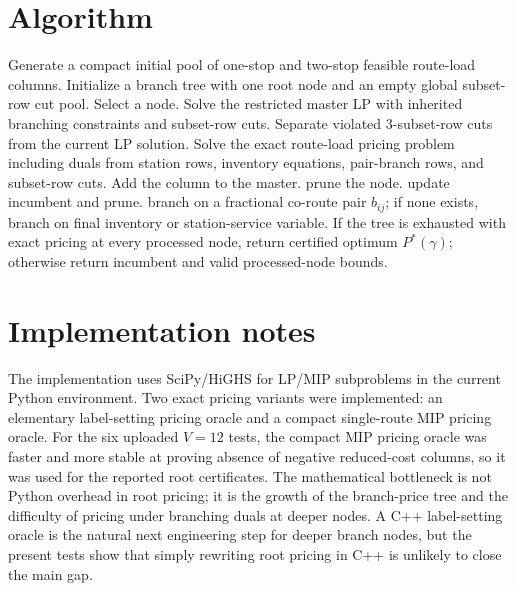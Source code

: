 \documentclass[11pt]{article}
\begin{document}
\section{Algorithm}

\begin{algorithm}[H]
\caption{GF-RL-BPC for a fixed Gini cap $\gamma$}
\begin{algorithmic}[1]
\State Generate a compact initial pool of one-stop and two-stop feasible route-load columns.
\State Initialize a branch tree with one root node and an empty global subset-row cut pool.
  \State Select a node.
  \Repeat
    \State Solve the restricted master LP with inherited branching constraints and subset-row cuts.
    \State Separate violated 3-subset-row cuts from the current LP solution.
    \State Solve the exact route-load pricing problem including duals from station rows, inventory equations, pair-branch rows, and subset-row cuts.
       \State Add the column to the master.
    \EndIf
   prune the node.
   update incumbent and prune.
  \Else branch on a fractional co-route pair $b_{ij}$; if none exists, branch on final inventory or station-service variable.
  \EndIf
\EndWhile
\State If the tree is exhausted with exact pricing at every processed node, return certified optimum $P^*(\gamma)$; otherwise return incumbent and valid processed-node bounds.
\end{algorithmic}
\end{algorithm}

\section{Implementation notes}
The implementation uses SciPy/HiGHS for LP/MIP subproblems in the current Python environment. Two exact pricing variants were implemented: an elementary label-setting pricing oracle and a compact single-route MIP pricing oracle. For the six uploaded $V=12$ tests, the compact MIP pricing oracle was faster and more stable at proving absence of negative reduced-cost columns, so it was used for the reported root certificates. The mathematical bottleneck is not Python overhead in root pricing; it is the growth of the branch-price tree and the difficulty of pricing under branching duals at deeper nodes. A C++ label-setting oracle is the natural next engineering step for deeper branch nodes, but the present tests show that simply rewriting root pricing in C++ is unlikely to close the main gap.
\end{document}
